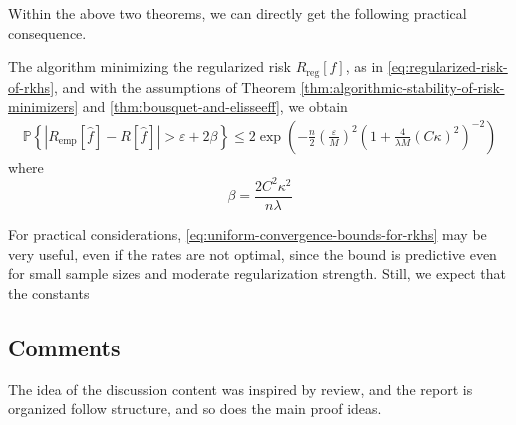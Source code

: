 Within the above two theorems, we can directly get the following practical consequence.
\begin{corollary}
	The algorithm minimizing the regularized risk $R_{\text{reg}}[f]$, as in \eqref{eq:regularized-risk-of-rkhs}, and with the assumptions of Theorem \ref{thm:algorithmic-stability-of-risk-minimizers} and \ref{thm:bousquet-and-elisseeff}, we obtain
	\begin{eqnarray}
		\label{eq:uniform-convergence-bounds-for-rkhs}
		\mathbb{P}\left\{\left|R_{\text{emp}}[\hat{f}]-R[\hat{f}]\right|>\varepsilon+2\beta\right\}\leq 2\exp\left(-\frac{n}{2}\left(\frac{\varepsilon}{M}\right)^{2}\left(1+\frac{4}{\lambda M}(C \kappa)^{2}\right)^{-2}\right)
	\end{eqnarray}
	where
	\begin{equation*}
		\beta=\frac{2C^{2}\kappa^{2}}{n\lambda}
	\end{equation*}
\end{corollary}

\begin{remark}
	For practical considerations, \eqref{eq:uniform-convergence-bounds-for-rkhs} may be very useful, even if the rates are not optimal, since the bound is predictive even for small sample sizes and moderate regularization strength. Still, we expect that the constants
\end{remark}

\subsection*{Comments}

The idea of the discussion content was inspired by \cite[Section 3]{hofmann_kernel_2008} review, and the report is organized follow \cite[Chapter 12]{scholkopf_learning_2001} structure, and so does the main proof ideas.
